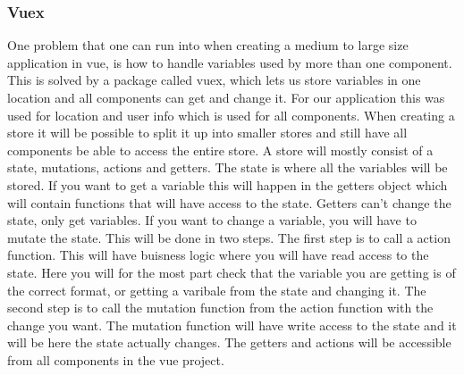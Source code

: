 \subsubsection{Vuex}
One problem that one can run into when creating a medium to large size application in vue, is how to handle variables used by more than one component. This is solved by a package called vuex, which lets us store variables in one location and all components can get and change it. For our application this was used for location and user info which is used for all components. When creating a store it will be possible to split it up into smaller stores and still have all components be able to access the entire store. A store will mostly consist of a state, mutations, actions and getters. The state is where all the variables will be stored. If you want to get a variable this will happen in the getters object which will contain functions that will have access to the state. Getters can't change the state, only get variables. If you want to change a variable, you will have to mutate the state. This will be done in two steps. The first step is to call a action function. This will have buisness logic where you will have read access to the state. Here you will for the most part check that the variable you are getting is of the correct format, or getting a varibale from the state and changing it. The second step is to call the mutation function from the action function with the change you want. The mutation function will have write access to the state and it will be here the state actually changes. The getters and actions will be accessible from all components in the vue project.
